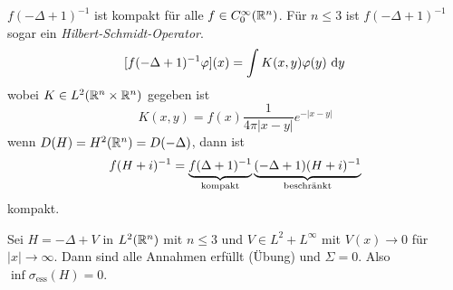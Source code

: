 \documentclass{mycourse}
\begin{document}
\begin{nt*}
$f(-\Delta+1)^{-1}$ ist kompakt für alle $f\in C_0^\infty(\R^n)$. Für $n\le 3$ ist $f(-\Delta+1)^{-1}$ sogar ein \emph{Hilbert-Schmidt-Operator}.
\[
[f(-\Delta+1)^{-1} \phi] (x) = \int K(x,y) \phi(y) \, \dx[y]
\]
wobei $K\in L^2(\R^n \times \R^n)$ gegeben ist
\[
K(x,y) =f(x) \frac{1}{4\pi |x-y|} e^{-|x-y|}
\]
wenn $D(H)=H^2(\R^n) = D(-\Delta)$, dann ist
\[
f(H+i)^{-1} = \underbrace{f(\-\Delta +1)^{-1}}_{\text{kompakt}} \underbrace{(-\Delta +1) (H+i)^{-1}}_{\text{beschränkt}}
\]
kompakt.
\end{nt*}
\begin{ex*}
Sei $H=-\Delta+V$ in $L^2(\R^n)$ mit $n\le 3$ und $V\in L^2 + L^\infty$ mit $V(x)\to 0$ für $|x|\to \infty$. Dann sind alle Annahmen erfüllt (Übung) und $\Sigma=0$. Also $\inf \sigma_{\text{ess}}(H) = 0$.
\fixme[fig5]
\end{ex*}
\end{document}
